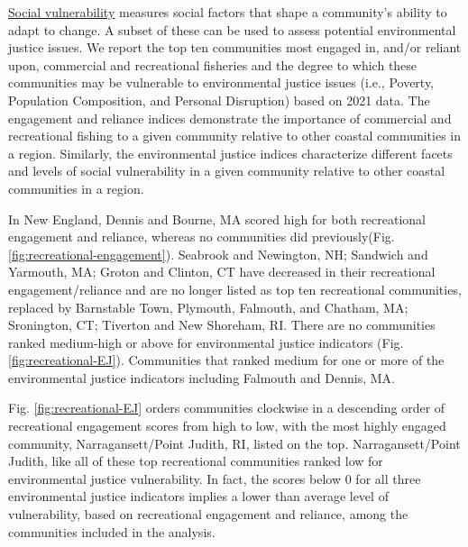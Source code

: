 \documentclass[
  10pt,
]{article}
\begin{document}
\href{https://noaa-edab.github.io/catalog/engagement-reliance-and-environmental-justice-in-top-fishing-communities.html}{Social vulnerability} measures social factors that shape a community's ability to adapt to change. A subset of these can be used to assess potential environmental justice issues. We report the top ten communities most engaged in, and/or reliant upon, commercial and recreational fisheries and the degree to which these communities may be vulnerable to environmental justice issues (i.e., Poverty, Population Composition, and Personal Disruption) based on 2021 data. The engagement and reliance indices demonstrate the importance of commercial and recreational fishing to a given community relative to other coastal communities in a region. Similarly, the environmental justice indices characterize different facets and levels of social vulnerability in a given community relative to other coastal communities in a region.

In New England, Dennis and Bourne, MA scored high for both recreational engagement and reliance, whereas no communities did previously(Fig.\ref{fig:recreational-engagement}). Seabrook and Newington, NH; Sandwich and Yarmouth, MA; Groton and Clinton, CT have decreased in their recreational engagement/reliance and are no longer listed as top ten recreational communities, replaced by Barnstable Town, Plymouth, Falmouth, and Chatham, MA; Sronington, CT; Tiverton and New Shoreham, RI. There are no communities ranked medium-high or above for environmental justice indicators (Fig. \ref{fig:recreational-EJ}). Communities that ranked medium for one or more of the environmental justice indicators including Falmouth and Dennis, MA.

Fig. \ref{fig:recreational-EJ} orders communities clockwise in a descending order of recreational engagement scores from high to low, with the most highly engaged community, Narragansett/Point Judith, RI, listed on the top. Narragansett/Point Judith, like all of these top recreational communities ranked low for environmental justice vulnerability. In fact, the scores below 0 for all three environmental justice indicators implies a lower than average level of vulnerability, based on recreational engagement and reliance, among the communities included in the analysis.
\end{document}
